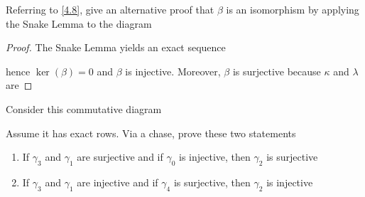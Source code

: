 \documentclass[11pt]{article}
\begin{document}
\begin{exercise}
\label{5.13}
Referring to \ref{4.8}, give an alternative proof that \(\beta\) is an isomorphism by
applying the Snake Lemma to the diagram
\begin{center}
\end{center}
\end{exercise}

\begin{proof}
The Snake Lemma yields an exact sequence
\begin{center}
\end{center}
hence \(\ker(\beta)=0\) and \(\beta\) is injective. Moreover, \(\beta\) is surjective because
\(\kappa\) and \(\lambda\) are
\end{proof}

\begin{exercise}
Consider this commutative diagram
\begin{center}
\end{center}
Assume it has exact rows. Via a chase, prove these two statements
\begin{enumerate}
\item If \(\gamma_3\) and \(\gamma_1\) are surjective and if \(\gamma_0\) is
injective, then \(\gamma_2\) is surjective
\item If \(\gamma_3\) and \(\gamma_1\) are injective and if \(\gamma_4\) is
surjective, then \(\gamma_2\) is injective
\end{enumerate}
\end{exercise}
\end{document}
